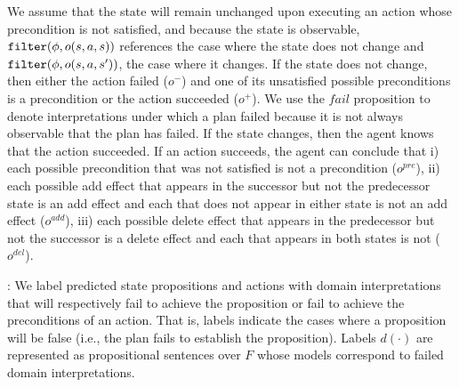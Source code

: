 \documentclass[letterpaper]{article}
\def\und#1{\noindent{\bf #1}:}
\begin{document}
\noindent We assume that the state will remain unchanged upon executing
an action whose precondition is not satisfied, and because the
state is observable, ${\tt filter}(\phi, o(s, a, s))$ references the case where
the state does not change and ${\tt filter}(\phi, o(s, a, s'))$, the case where
it changes.  If the state does not change, then either the action failed
($o^-$) and one of its unsatisfied possible preconditions is a precondition  or
the action succeeded ($o^+$).  We use the $fail$ proposition to denote
interpretations under which a plan failed because it is not always observable
that the plan has failed. If the state changes, then the agent knows that the
action succeeded. If an action  succeeds, the agent can conclude that i) each possible precondition that was not satisfied is not a precondition ($o^{pre}$), ii) each possible add effect that
appears in the successor but not the predecessor state is an add effect and each that does not appear in either state is not an add 
effect ($o^{add}$), iii) each possible delete effect that appears in the
predecessor but not the successor is a delete effect and each that  appears in both states is
not ($o^{del}$).



\und{Planning} We label predicted state propositions and actions with domain
interpretations that will respectively fail to achieve the proposition or fail
to achieve the preconditions of an action.  That is, labels indicate the cases
where a proposition will be false (i.e., the plan fails to establish the
proposition). Labels $d(\cdot)$ are represented as  propositional sentences over
$F$ whose models correspond to failed domain interpretations.
\end{document}
